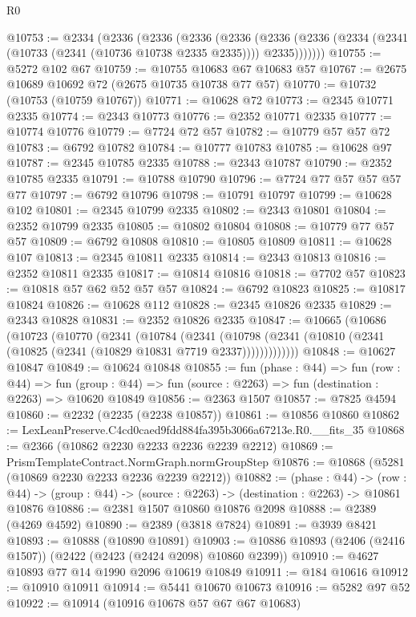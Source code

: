 \begin{lexlean}{R0}
\begin{coremodule}
@10753 := @2334
    (@2336
      (@2336
        (@2336
          (@2336
            (@2336 (@2336 (@2334 (@2341 (@10733 (@2341 (@10736 @10738 @2335 @2335)))) @2335)))))))
@10755 := @5272 @102 @67
@10759 := @10755 @10683 @67 @10683 @57
@10767 := @2675 @10689 @10692 @72 (@2675 @10735 @10738 @77 @57)
@10770 := @10732 (@10753 (@10759 @10767))
@10771 := @10628 @72
@10773 := @2345 @10771 @2335
@10774 := @2343 @10773
@10776 := @2352 @10771 @2335
@10777 := @10774 @10776
@10779 := @7724 @72 @57
@10782 := @10779 @57 @57 @72
@10783 := @6792 @10782
@10784 := @10777 @10783
@10785 := @10628 @97
@10787 := @2345 @10785 @2335
@10788 := @2343 @10787
@10790 := @2352 @10785 @2335
@10791 := @10788 @10790
@10796 := @7724 @77 @57 @57 @57 @77
@10797 := @6792 @10796
@10798 := @10791 @10797
@10799 := @10628 @102
@10801 := @2345 @10799 @2335
@10802 := @2343 @10801
@10804 := @2352 @10799 @2335
@10805 := @10802 @10804
@10808 := @10779 @77 @57 @57
@10809 := @6792 @10808
@10810 := @10805 @10809
@10811 := @10628 @107
@10813 := @2345 @10811 @2335
@10814 := @2343 @10813
@10816 := @2352 @10811 @2335
@10817 := @10814 @10816
@10818 := @7702 @57
@10823 := @10818 @57 @62 @52 @57 @57
@10824 := @6792 @10823
@10825 := @10817 @10824
@10826 := @10628 @112
@10828 := @2345 @10826 @2335
@10829 := @2343 @10828
@10831 := @2352 @10826 @2335
@10847 := @10665
    (@10686
      (@10723
        (@10770
          (@2341
            (@10784
              (@2341
                (@10798 (@2341 (@10810 (@2341 (@10825 (@2341 (@10829 @10831 @7719 @2337)))))))))))))
@10848 := @10627 @10847
@10849 := @10624 @10848
@10855 := fun (phase : @44) =>
  fun (row : @44) =>
  fun (group : @44) => fun (source : @2263) => fun (destination : @2263) => @10620 @10849
@10856 := @2363 @1507
@10857 := @7825 @4594
@10860 := @2232 (@2235 (@2238 @10857))
@10861 := @10856 @10860
@10862 := LexLeanPreserve.C4cd0caed9fdd884fa395b3066a67213e.R0.__fits_35
@10868 := @2366 (@10862 @2230 @2233 @2236 @2239 @2212)
@10869 := PrismTemplateContract.NormGraph.normGroupStep
@10876 := @10868 (@5281 (@10869 @2230 @2233 @2236 @2239 @2212))
@10882 := (phase : @44) ->
  (row : @44) -> (group : @44) -> (source : @2263) -> (destination : @2263) -> @10861 @10876
@10886 := @2381 @1507 @10860 @10876 @2098
@10888 := @2389 (@4269 @4592)
@10890 := @2389 (@3818 @7824)
@10891 := @3939 @8421
@10893 := @10888 (@10890 @10891)
@10903 := @10886 @10893 (@2406 (@2416 @1507)) (@2422 (@2423 (@2424 @2098) @10860 @2399))
@10910 := @4627 @10893 @77 @14 @1990 @2096 @10619 @10849
@10911 := @184 @10616
@10912 := @10910 @10911
@10914 := @5441 @10670 @10673
@10916 := @5282 @97 @52
@10922 := @10914 (@10916 @10678 @57 @67 @67 @10683)

\end{coremodule}
\end{lexlean}
